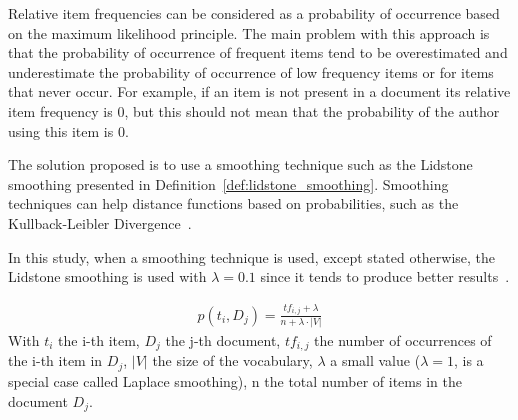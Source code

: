 Relative item frequencies can be considered as a probability of occurrence based on the maximum likelihood principle.
The main problem with this approach is that the probability of occurrence of frequent items tend to be overestimated and underestimate the probability of occurrence of low frequency items or for items that never occur.
For example, if an item is not present in a document its relative item frequency is 0, but this should not mean that the probability of the author using this item is 0.

The solution proposed is to use a smoothing technique such as the Lidstone smoothing presented in Definition~\ref{def:lidstone_smoothing}.
Smoothing techniques can help distance functions based on probabilities, such as the Kullback-Leibler Divergence~\cite{savoy_stylo}.

In this study, when a smoothing technique is used, except stated otherwise, the Lidstone smoothing is used with $\lambda = 0.1$ since it tends to produce better results~\cite{savoy_stylo}.

\begin{definition}
  \label{def:lidstone_smoothing}
  \begin{gather*}
    p(t_i, D_j) = \frac{tf_{i,j} + \lambda}{n + \lambda \cdot |V|}
  \end{gather*}
  With $t_i$ the i-th item, $D_j$ the j-th document, $tf_{i,j}$ the number of occurrences of the i-th item in $D_j$, $|V|$ the size of the vocabulary, $\lambda$ a small value ($\lambda = 1$, is a special case called Laplace smoothing), n the total number of items in the document $D_j$.
\end{definition}

